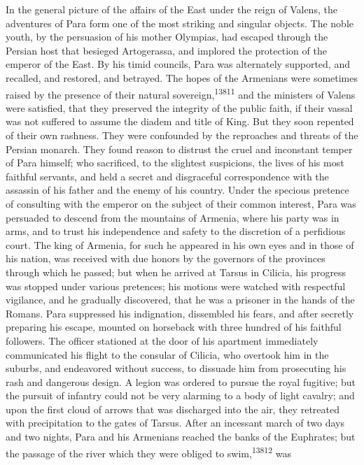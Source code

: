 In the general picture of the affairs of the East under the reign
of Valens, the adventures of Para form one of the most striking
and singular objects. The noble youth, by the persuasion of his
mother Olympias, had escaped through the Persian host that
besieged Artogerassa, and implored the protection of the emperor
of the East. By his timid councils, Para was alternately
supported, and recalled, and restored, and betrayed. The hopes of
the Armenians were sometimes raised by the presence of their
natural sovereign,\textsuperscript{13811} and the ministers of Valens were
satisfied, that they preserved the integrity of the public faith,
if their vassal was not suffered to assume the diadem and title
of King. But they soon repented of their own rashness. They were
confounded by the reproaches and threats of the Persian monarch.
They found reason to distrust the cruel and inconstant temper of
Para himself; who sacrificed, to the slightest suspicions, the
lives of his most faithful servants, and held a secret and
disgraceful correspondence with the assassin of his father and
the enemy of his country. Under the specious pretence of
consulting with the emperor on the subject of their common
interest, Para was persuaded to descend from the mountains of
Armenia, where his party was in arms, and to trust his
independence and safety to the discretion of a perfidious court.
The king of Armenia, for such he appeared in his own eyes and in
those of his nation, was received with due honors by the
governors of the provinces through which he passed; but when he
arrived at Tarsus in Cilicia, his progress was stopped under
various pretences; his motions were watched with respectful
vigilance, and he gradually discovered, that he was a prisoner in
the hands of the Romans. Para suppressed his indignation,
dissembled his fears, and after secretly preparing his escape,
mounted on horseback with three hundred of his faithful
followers. The officer stationed at the door of his apartment
immediately communicated his flight to the consular of Cilicia,
who overtook him in the suburbs, and endeavored without success,
to dissuade him from prosecuting his rash and dangerous design. A
legion was ordered to pursue the royal fugitive; but the pursuit
of infantry could not be very alarming to a body of light
cavalry; and upon the first cloud of arrows that was discharged
into the air, they retreated with precipitation to the gates of
Tarsus. After an incessant march of two days and two nights, Para
and his Armenians reached the banks of the Euphrates; but the
passage of the river which they were obliged to swim,\textsuperscript{13812} was
